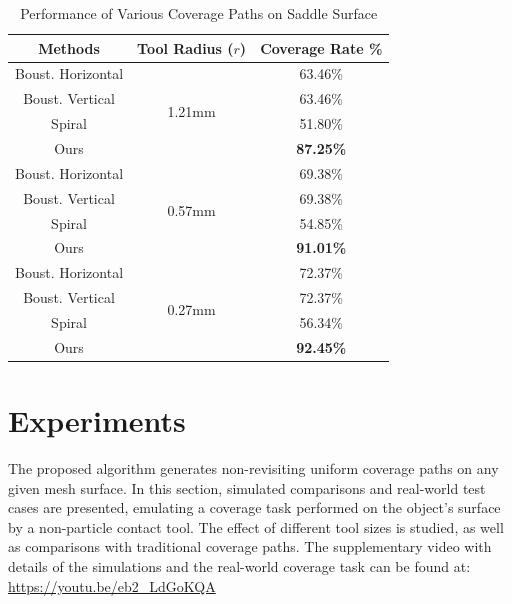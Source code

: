 \documentclass[lettersize,journal]{IEEEtran}
\begin{document}
\begin{table}[t]
\centering
\caption{Performance of Various Coverage Paths on Saddle Surface}\label{tab:coverage_rate}
\begin{tabular}{c|c|c}
\hline
Methods & Tool Radius ($r$) & Coverage Rate \%\\
\hline
\hline
Boust. Horizontal & \multirow{4}{*}{1.21mm} & 63.46\%\\
\cline{1-1}\cline{3-3}
Boust. Vertical & &63.46\%\\
\cline{1-1}\cline{3-3}
Spiral & &51.80\%\\
\cline{1-1}\cline{3-3}
Ours & & \textbf{87.25\%}\\
\hline
Boust. Horizontal & \multirow{4}{*}{0.57mm} & 69.38\%\\
\cline{1-1}\cline{3-3}
Boust. Vertical & &69.38\%\\
\cline{1-1}\cline{3-3}
Spiral & & 54.85\%\\
\cline{1-1}\cline{3-3}
Ours & & \textbf{91.01\%}\\
\hline
Boust. Horizontal & \multirow{4}{*}{0.27mm} & 72.37\%\\
\cline{1-1}\cline{3-3}
Boust. Vertical & & 72.37\%\\
\cline{1-1}\cline{3-3}
Spiral & & 56.34\%\\
\cline{1-1}\cline{3-3}
Ours & & \textbf{92.45\%}\\
\hline
\end{tabular}
\end{table}


\section{Experiments}\label{section_experiment}
The proposed algorithm generates non-revisiting uniform coverage paths on any given mesh surface. 
In this section, simulated comparisons and real-world test cases are presented, emulating a coverage task performed 
on the object's surface by a non-particle contact tool. The effect of different tool sizes is studied, as well as 
comparisons with traditional coverage paths. 
The supplementary video with details of the simulations and the real-world coverage task can be found at: \\\url{https://youtu.be/eb2_LdGoKQA}
\end{document}
